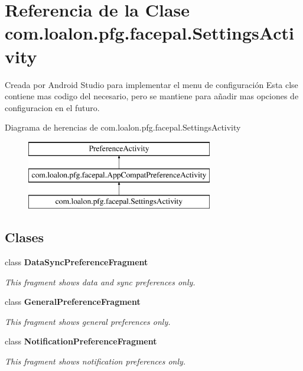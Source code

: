 \hypertarget{classcom_1_1loalon_1_1pfg_1_1facepal_1_1_settings_activity}{}\section{Referencia de la Clase com.\+loalon.\+pfg.\+facepal.\+Settings\+Activity}
\label{classcom_1_1loalon_1_1pfg_1_1facepal_1_1_settings_activity}


Creada por Android Studio para implementar el menu de configuración Esta clse contiene mas codigo del necesario, pero se mantiene para añadir mas opciones de configuracion en el futuro.  


Diagrama de herencias de com.\+loalon.\+pfg.\+facepal.\+Settings\+Activity\begin{figure}[H]
\begin{center}
\leavevmode
\includegraphics[height=3.000000cm]{classcom_1_1loalon_1_1pfg_1_1facepal_1_1_settings_activity}
\end{center}
\end{figure}
\subsection*{Clases}
\begin{DoxyCompactItemize}
\item 
class {\bfseries Data\+Sync\+Preference\+Fragment}
\begin{DoxyCompactList}\small\item\em This fragment shows data and sync preferences only. \end{DoxyCompactList}\item 
class {\bfseries General\+Preference\+Fragment}
\begin{DoxyCompactList}\small\item\em This fragment shows general preferences only. \end{DoxyCompactList}\item 
class {\bfseries Notification\+Preference\+Fragment}
\begin{DoxyCompactList}\small\item\em This fragment shows notification preferences only. \end{DoxyCompactList}\end{DoxyCompactItemize}

